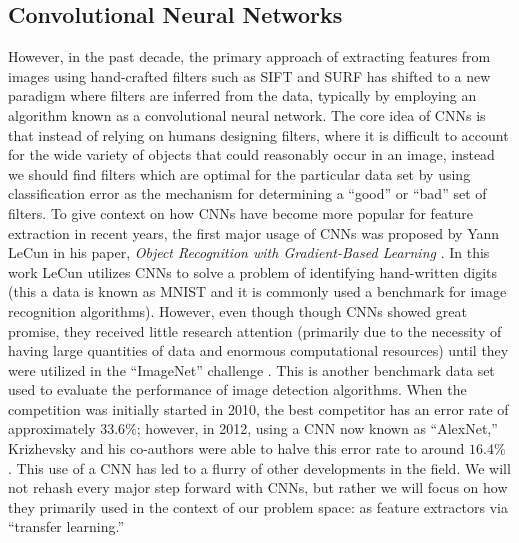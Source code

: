 \documentclass[../thesis.tex]{subfiles}
\begin{document}
\subsection{Convolutional Neural Networks}
However, in the past decade, the primary approach of extracting features from images using hand-crafted filters such as SIFT and SURF has shifted to a new paradigm where filters are inferred from the data, typically by employing an algorithm known as a convolutional neural network. The core idea of CNNs is that instead of relying on humans designing filters, where it is difficult to account for the wide variety of objects that could reasonably occur in an image, instead we should find filters which are optimal for the particular data set by using classification error as the mechanism for determining a ``good'' or ``bad'' set of filters. To give context on how CNNs have become more popular for feature extraction in recent years, the first major usage of CNNs was proposed by Yann LeCun in his paper, \textit{Object Recognition with Gradient-Based Learning} \cite{lecun1999object}. In this work LeCun utilizes CNNs to solve a problem of identifying hand-written digits (this a data is known as MNIST and it is commonly used a benchmark for image recognition algorithms). However, even though though CNNs showed great promise, they received little research attention (primarily due to the necessity of having large quantities of data and enormous computational resources) until they were utilized in the ``ImageNet'' challenge \cite{russakovsky2015imagenet}. This is another benchmark data set used to evaluate the performance of image detection algorithms. When the competition was initially started in 2010, the best competitor has an error rate of approximately $33.6\%$; however, in 2012, using a CNN now known as ``AlexNet,'' Krizhevsky and his co-authors were able to halve this error rate to around $16.4\%$ \cite{krizhevsky2012imagenet}. This use of a CNN has led to a flurry of other developments in the field. We will not rehash every major step forward with CNNs, but rather we will focus on how they primarily used in the context of our problem space: as feature extractors via ``transfer learning.'' 
\end{document}
